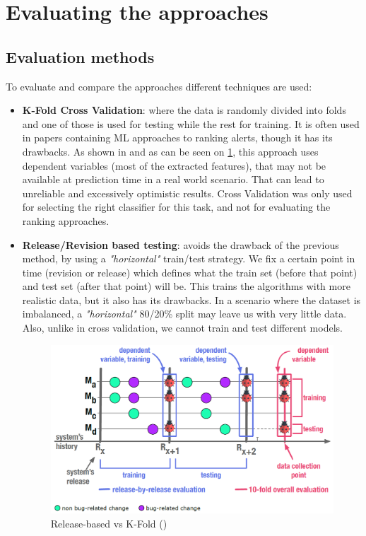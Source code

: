 
\section{Evaluating the approaches}\label{sec:evaluation}

\subsection{Evaluation methods}
\label{evaluation:methods}

To evaluate and compare the approaches different techniques are used: 
\begin{itemize}
	\item \textbf{K-Fold Cross Validation}: where the data is randomly divided into folds and one of those is used for testing while the rest for training. It is often used in papers containing ML approaches to ranking alerts, though it has its drawbacks. As shown in \cite{performance_method_bug} and as can be seen on \cref{kfold_vs_release}, this approach uses dependent variables (most of the extracted features), that may not be available at prediction time in a real world scenario. That can lead to unreliable and excessively optimistic results. Cross Validation was only used for selecting the right classifier for this task, and not for evaluating the ranking approaches.
	\item \textbf{Release/Revision based testing}: avoids the drawback of the previous method, by using a \textit{"horizontal"} train/test strategy. We fix a certain point in time (revision or release) which defines what the train set (before that point) and test set (after that point) will be. This trains the algorithms with more realistic data, but it also has its drawbacks. In a scenario where the dataset is imbalanced, a \textit{"horizontal"} 80/20\% split may leave us with very little data. Also, unlike in cross validation, we cannot train and test different models.
	
	\begin{figure}[H]
		\centering
		\includegraphics[scale=0.3]{./src/release_based_testing.png}
		\caption{Release-based vs K-Fold (\cite{performance_method_bug})}
		\label{kfold_vs_release}
	\end{figure}
	

\end{itemize}
